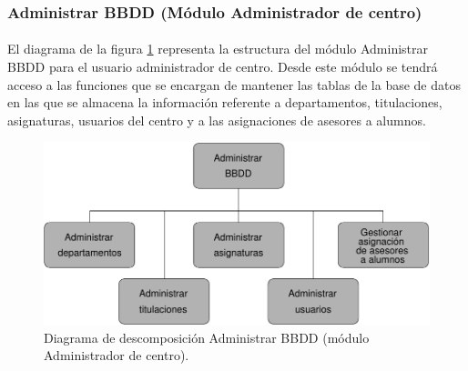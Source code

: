 \subsubsection{Administrar BBDD (Módulo Administrador de centro)}

  \paragraph{}El diagrama de la figura
  \ref{diagramaDescomposicionAdministrarBBDD-admCentro} representa la estructura
  del módulo Administrar BBDD para el usuario administrador de centro. Desde
  este módulo se tendrá acceso a las funciones que se encargan de mantener las
  tablas de la base de datos en las que se almacena la información referente a
  departamentos, titulaciones, asignaturas, usuarios del centro y a las
  asignaciones de asesores a alumnos.

  \begin{figure}[!ht]
    \begin{center}
      \includegraphics[]{11.Disenyo_Arquitectonico/11.2.Diagramas_Descomposicion/11.2.3.Modulo_administrador_centro/AdministrarBBDD/Diagramas/administrar_bbdd.pdf}
      \caption{Diagrama de descomposición Administrar BBDD (módulo Administrador de centro).}
      \label{diagramaDescomposicionAdministrarBBDD-admCentro}
    \end{center}
  \end{figure}

 
 
 
 